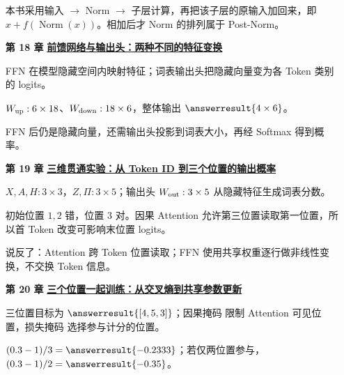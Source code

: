 \begin{enumerate}[leftmargin=5.4em,labelsep=.7em,itemsep=9pt]
\par{}本书采用输入 $\to$ Norm $\to$ 子层计算，再把该子层的原输入加回来，即 $x+f(\operatorname{Norm}(x))$。相加后才 Norm 的排列属于 Post-Norm。
\par{}
\item[\textbf{第 18 章}] \label{answer:10b-ffn-output-head}\textbf{\hyperref[check:10b-ffn-output-head]{前馈网络与输出头：两种不同的特征变换}}\par\nobreak
{}FFN 在模型隐藏空间内映射特征；词表输出头把隐藏向量变为各 Token 类别的 logits。
\par{}$W_{\rm up}:6\times18$、$W_{\rm down}:18\times6$，整体输出 $\answerresult{4\times6}$。
\par{}FFN 后仍是隐藏向量，还需输出头投影到词表大小，再经 Softmax 得到概率。
\par{}
\item[\textbf{第 19 章}] \label{answer:22b-token-to-output}\textbf{\hyperref[check:22b-token-to-output]{三维贯通实验：从 Token ID 到三个位置的输出概率}}\par\nobreak
 $X,A,H:3\times3$，$Z,\Pi:3\times5$；输出头 $W_{\rm out}:3\times5$ 从隐藏特征生成词表分数。
\par{}初始位置 $1,2$ 错，位置 $3$ 对。因果 Attention 允许第三位置读取第一位置，所以首 Token 改变可影响末位置 logits。
\par{}说反了：Attention 跨 Token 位置读取；FFN 使用共享权重逐行做非线性变换，不交换 Token 信息。
\par{}
\item[\textbf{第 20 章}] \label{answer:22c-language-training}\textbf{\hyperref[check:22c-language-training]{三个位置一起训练：从交叉熵到共享参数更新}}\par\nobreak
{}三位置目标为 $\answerresult{[4,5,3]}$；因果掩码 限制 Attention 可见位置，损失掩码 选择参与计分的位置。
\par{}$(0.3-1)/3=\answerresult{-0.2333}$；若仅两位置参与，$(0.3-1)/2=\answerresult{-0.35}$。

\end{enumerate}
